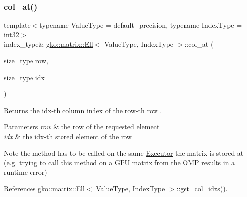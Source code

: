 \subsubsection{\texorpdfstring{col\+\_\+at()}{col\_at()}\hspace{0.1cm}{\footnotesize\ttfamily [1/2]}}
{\footnotesize\ttfamily template$<$typename Value\+Type = default\+\_\+precision, typename Index\+Type = int32$>$ \\
index\+\_\+type\& \hyperlink{classgko_1_1matrix_1_1Ell}{gko\+::matrix\+::\+Ell}$<$ Value\+Type, Index\+Type $>$\+::col\+\_\+at (\begin{DoxyParamCaption}\item[{\hyperlink{namespacegko_a6e5c95df0ae4e47aab2f604a22d98ee7}{size\+\_\+type}}]{row,  }\item[{\hyperlink{namespacegko_a6e5c95df0ae4e47aab2f604a22d98ee7}{size\+\_\+type}}]{idx }\end{DoxyParamCaption})\hspace{0.3cm}{\ttfamily [noexcept]}}



Returns the {\ttfamily idx}-\/th column index of the {\ttfamily row}-\/th row . 


\begin{DoxyParams}{Parameters}
{\em row} & the row of the requested element \\
\hline
{\em idx} & the idx-\/th stored element of the row\\
\hline
\end{DoxyParams}
\begin{DoxyNote}{Note}
the method has to be called on the same \hyperlink{classgko_1_1Executor}{Executor} the matrix is stored at (e.\+g. trying to call this method on a G\+PU matrix from the O\+MP results in a runtime error) 
\end{DoxyNote}


References gko\+::matrix\+::\+Ell$<$ Value\+Type, Index\+Type $>$\+::get\+\_\+col\+\_\+idxs().

\mbox{\label{classgko_1_1matrix_1_1Ell_a1ac1702011ead4e56857de130b4a5301}} 
